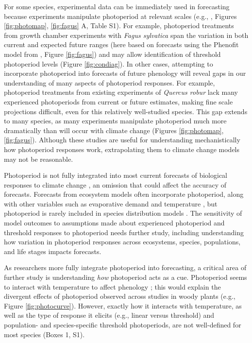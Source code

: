 \documentclass{article}
\begin{document}
\par For some species, experimental data can be immediately used in forecasting because experiments manipulate photoperiod at relevant scales (e.g., \citet{Basler:2014aa,Heide:2015aa}, Figures \ref{fig:photomap}, \ref{fig:fagus} A, Table S1).  For example, photoperiod treatments from growth chamber experiments with \emph{Fagus sylvatica} span the variation in both current and expected future ranges (here based on forecasts using the Phenofit model from \citet{duputie2015}, Figure \ref{fig:fagus}) and may allow identification of threshold photoperiod levels (Figure \ref{fig:condiag}). In other cases, attempting to incorporate photoperiod into forecasts of future phenology will reveal gaps in our understanding of many aspects of photoperiod responses. For example, photoperiod treatments from existing experiments of \emph{Quercus robur} lack many experienced photoperiods from current or future estimates, making fine scale projections difficult, even for this relatively well-studied species. This gap extends to many species, as many experiments manipulate photoperiod much more dramatically than will occur with climate change (Figures \ref{fig:photomap}, \ref{fig:fagus}). Although these studies are useful for understanding mechanistically how photoperiod responses work, extrapolating them to climate change models may not be reasonable.

\par Photoperiod is not fully integrated into most current forecasts of biological responses to climate change \citep[but see][]{tobin2008}, an omission that could affect the accuracy of forecasts. Forecasts from ecosystem models often incorporate photoperiod, along with other variables such as evaporative demand and temperature \citep [e.g., ED] []{jolly2005,medvigy2013}, but photoperiod is rarely included in species distribution models \citep [e.g.,] []{morin2009,zhu2012}. The sensitivity of model outcomes to assumptions made about experienced photoperiod and threshold responses to photoperiod needs further study, including understanding how variation in photoperiod responses across ecosystems, species, populations, and life stages impacts forecasts. 

\par As researchers more fully integrate photoperiod into forecasting, a critical area of further study is understanding \emph{how} photoperiod acts as a cue. Photoperiod seems to interact with temperature to affect phenology \citep[e.g., ][]{zydlewski2014}; this would explain the divergent effects of photoperiod observed across studies in woody plants (e.g., Figure \ref{fig:photocurve}). However, exactly how it interacts with temperature, as well as the type of response it elicits (e.g., linear versus threshold) and population- and species-specific threshold photoperiods, are not well-defined for most species (Boxes 1, S1).  
\end{document}
